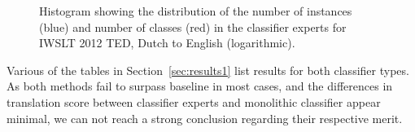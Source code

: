 \begin{table}
\noindent{}
\caption{Number of classifier experts generated per data set. 
}
\label{tab:expertcount}
\end{table}


\begin{figure}
\begin{center}
\newlength\figureheight
\newlength\figurewidth
\setlength\figureheight{6cm}
\setlength\figurewidth{8cm}

\caption{Histogram showing the distribution of the number of instances (blue)
and number of classes (red) in the classifier experts for IWSLT 2012 TED,
Dutch to English (logarithmic).}
\label{fig:histogram}
\end{center}
\end{figure}

Various of the tables in Section~\ref{sec:results1} list results for both classifier
types. As both methods fail to surpass baseline in most cases, and the
differences in translation score between classifier experts and monolithic
classifier appear minimal, we can not reach a strong conclusion regarding their
respective merit.




